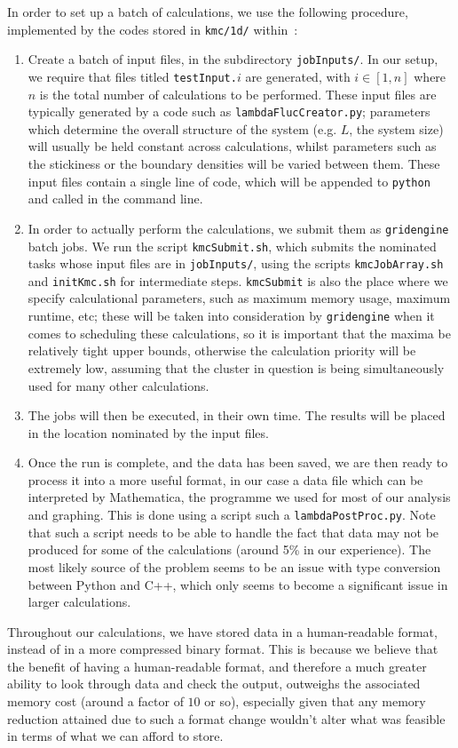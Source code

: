 In order to set up a batch of calculations, we use the following procedure, implemented by the codes
stored in \texttt{kmc/1d/} within~\cite{hellier2019a}:
\begin{enumerate}
 \item Create a batch of input files, in the subdirectory \texttt{jobInputs/}. In our setup, we
 require that files titled
 \texttt{testInput.}$i$ are generated, with $i \in [1, n]$ where $n$ is the total number of 
 calculations to be performed. These input files are typically generated by a code such as 
 \texttt{lambdaFlucCreator.py}; parameters which determine the overall structure
 of the system (e.g. $L$, the system size) will usually be held constant across calculations, whilst
 parameters such as the stickiness or the boundary densities will be varied between them. These input files contain a single line of code, which will be appended to \texttt{python } and called in the command line.
 \item In order to actually perform the calculations, we submit them as \texttt{gridengine} batch
 jobs. We  run the script \texttt{kmcSubmit.sh}, which submits the nominated tasks whose input
 files are in \texttt{jobInputs/}, using the scripts \texttt{kmcJobArray.sh} and 
 \texttt{initKmc.sh} for intermediate steps. \texttt{kmcSubmit} is also the place where we specify
 calculational parameters, such as maximum memory usage, maximum runtime, etc; these will be taken
 into consideration by \texttt{gridengine} when it comes to scheduling these calculations, so it
 is important that the maxima be relatively tight upper bounds, otherwise the calculation priority
 will be extremely low, assuming that the cluster in question is being simultaneously used for many other
 calculations.
 \item The jobs will then be executed, in their own time. The results will be placed in the location
 nominated by the input files.
 \item Once the run is complete, and the data has been saved, we are then ready to process it into a
 more useful format, in our case a data file which can be interpreted by Mathematica, the programme
 we used for most of our analysis and graphing. This is done using a script such a 
 \texttt{lambdaPostProc.py}. Note that such
 a script needs to be able to handle the fact that data may not be produced for some of the 
 calculations (around 5\% in our experience). The most likely source of the
 problem seems to be an issue with type conversion between Python and C++, which only seems to 
 become a significant issue in larger calculations.
\end{enumerate}
Throughout our calculations, we have stored data in a human-readable format, instead of
in a more compressed binary format. This is because we believe that the benefit of having a 
human-readable format, and therefore a much greater ability to look through data and check the 
output, outweighs the associated memory cost (around a factor of $10$ or so), 
especially given that any memory reduction attained due to such a format change wouldn't alter
what was feasible in terms of what we can afford to store.


